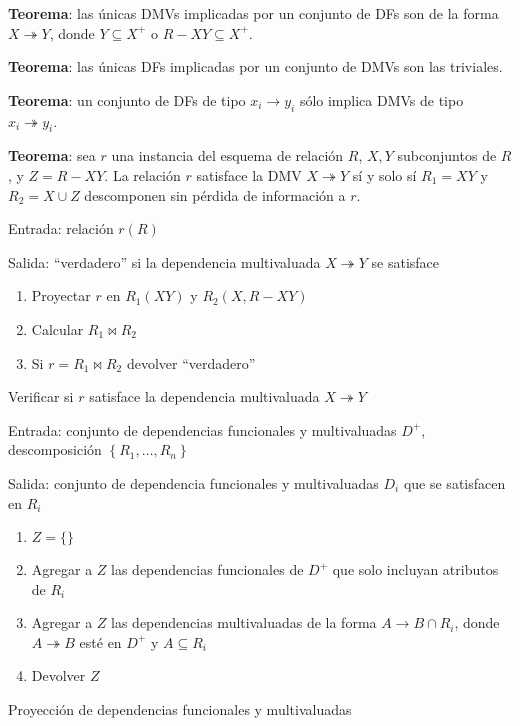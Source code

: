 \documentclass[a4paper, twoside]{article}
\begin{document}
\textbf{Teorema}: las únicas DMVs implicadas por un conjunto de DFs son de la forma $X \twoheadrightarrow Y$, donde $Y \subseteq X^{+}$ o $R - XY \subseteq X^{+}$.

\textbf{Teorema}: las únicas DFs implicadas por un conjunto de DMVs son las triviales.

\textbf{Teorema}: un conjunto de DFs de tipo $x_{i} \to y_{i}$ sólo implica DMVs de tipo $x_{i} \twoheadrightarrow y_{i}$.

\textbf{Teorema}: sea $r$ una instancia del esquema de relación $R$, $X, Y$ subconjuntos de $R$, y $Z = R - XY$. La relación $r$ satisface la DMV $X \twoheadrightarrow Y$ sí y solo sí $R_{1} = XY$ y $R_{2} = X \cup Z$ descomponen sin pérdida de información a $r$.

\begin{algorithm}[H]
	Entrada: relación $r(R)$

	Salida: ``verdadero'' si la dependencia multivaluada $X \twoheadrightarrow Y$ se satisface
	\begin{enumerate}
		\item Proyectar $r$ en $R_{1}(XY)$ y $R_{2}(X,R-XY)$
		\item Calcular $R_{1}\bowtie R_{2}$
		\item Si $r=R_{1}\bowtie R_{2}$ devolver ``verdadero''
	\end{enumerate}
	\caption{Verificar si $r$ satisface la dependencia multivaluada $X\twoheadrightarrow Y$}
\end{algorithm}

\begin{algorithm}[H]
	Entrada: conjunto de dependencias funcionales y multivaluadas $D^{+}$, descomposición $\left\{ R_{1},\ldots,R_{n}\right\}$

	Salida: conjunto de dependencia funcionales y multivaluadas $D_{i}$ que se satisfacen en $R_{i}$
	\begin{enumerate}
		\item $Z=\{\}$
		\item Agregar a $Z$ las dependencias funcionales de $D^{+}$ que solo incluyan atributos de $R_{i}$
		\item Agregar a $Z$ las dependencias multivaluadas de la forma $A\to B\cap R_{i}$, donde $A \twoheadrightarrow B$ esté en $D^{+}$ y $A\subseteq R_{i}$
		\item Devolver $Z$
	\end{enumerate}
	\caption{Proyección de dependencias funcionales y multivaluadas}
\end{algorithm}
\end{document}
